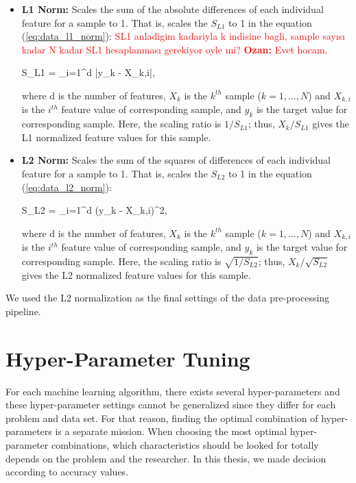 \begin{itemize}
    \item \textbf{L1 Norm:} Scales the sum of the absolute differences of each individual feature for a sample to 1. That is, scales the $S_{L1}$ to 1 in the equation (\ref{eq:data_l1_norm}): \textcolor{red}{SL1 anladigim kadariyla k indisine bagli, sample sayısı kadar N kadar SL1 hesaplanması gerekiyor oyle mi? \textbf{Ozan:} Evet hocam.}
    
    \be
    \label{eq:data_l1_norm}
    S_{L1} = \sum_{i=1}^{d} \big|y_{k} - X_{k,i}\big|\:,
    \ee
    
    where d is the number of features, $X_{k}$ is the $k^{th}$ sample ($k=1,\ldots,N$) and $X_{k,i}$ is the $i^{th}$ feature value of corresponding sample, and $y_{k}$ is the target value for corresponding sample. Here, the scaling ratio is $1 / S_{L1}$; thus, $X_{k} / S_{L1}$ gives the L1 normalized feature values for this sample.
    
    \item \textbf{L2 Norm:} Scales the sum of the squares of differences of each individual feature for a sample to 1. That is, scales the $S_{L2}$ to 1 in the equation (\ref{eq:data_l2_norm}):
    
    \be
    \label{eq:data_l2_norm}
    S_{L2} = \sum_{i=1}^{d} \big(y_{k} - X_{k,i}\big)^{2}\:,
    \ee
    
    where d is the number of features, $X_{k}$ is the $k^{th}$ sample ($k=1,\ldots,N$) and $X_{k,i}$ is the $i^{th}$ feature value of corresponding sample, and $y_{k}$ is the target value for corresponding sample. Here, the scaling ratio is $\sqrt{1 / S_{L2}}$; thus, $X_{k} / \sqrt{S_{L2}}$ gives the L2 normalized feature values for this sample.
\end{itemize}

We used the L2 normalization as the final settings of the data pre-processing pipeline.

\section{Hyper-Parameter Tuning}

For each machine learning algorithm, there exists several hyper-parameters and these hyper-parameter settings cannot be generalized since they differ for each problem and data set. For that reason, finding the optimal combination of hyper-parameters is a separate mission. When choosing the most optimal hyper-parameter combinations, which characteristics should be looked for totally depends on the problem and the researcher. In this thesis, we made decision according to accuracy values.


